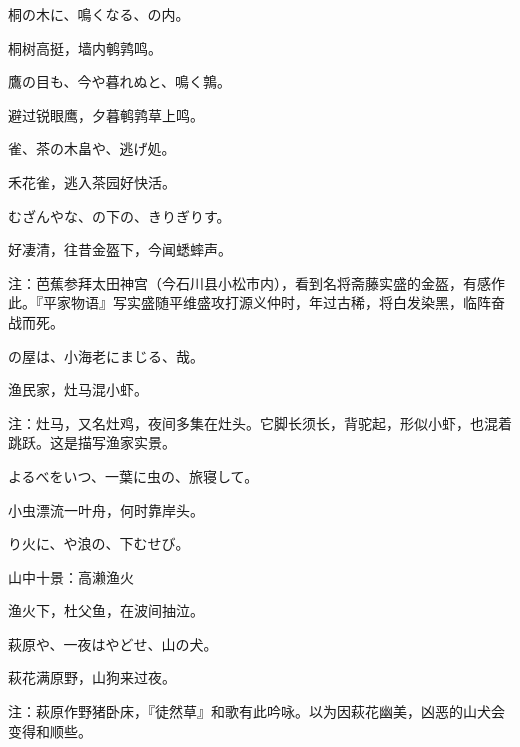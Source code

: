 \begin{haiku}
    {\FH 桐の木に、鳴くなる、の内。}

    {\FK 桐树高挺，墙内鹌鹑鸣。}
\end{haiku}

\begin{haiku}
    {\FH 鷹の目も、今や暮れぬと、鳴く鶉。}

    {\FK 避过锐眼鹰，夕暮鹌鹑草上鸣。}
\end{haiku}

\begin{haiku}
    {\FH {}雀、茶の木畠や、逃げ処。}

    {\FK 禾花雀，逃入茶园好快活。}
\end{haiku}

\begin{haiku}
    {\FH むざんやな、の下の、きりぎりす。}

    {\FK 好凄清，往昔金盔下，今闻蟋蟀声。}

    {\FT 注：芭蕉参拜太田神宫（今石川县小松市内），看到名将斋藤实盛的金盔，有感作此。『平家物语』写实盛随平维盛攻打源义仲时，年过古稀，将白发染黑，临阵奋战而死。}
\end{haiku}

\begin{haiku}
    {\FH {}の屋は、小海老にまじる、哉。}

    {\FK 渔民家，灶马混小虾。}

    {\FT 注：灶马，又名灶鸡，夜间多集在灶头。它脚长须长，背驼起，形似小虾，也混着跳跃。这是描写渔家实景。}
\end{haiku}

\begin{haiku}
    {\FH よるべをいつ、一葉に虫の、旅寝して。}

    {\FK 小虫漂流一叶舟，何时靠岸头。}
\end{haiku}

\begin{haiku}
    {\FH {}り火に、や浪の、下むせび。}

    {\FK 山中十景：高濑渔火}

    {\FK 渔火下，杜父鱼，在波间抽泣。}
\end{haiku}

\begin{haiku}
    {\FH 萩原や、一夜はやどせ、山の犬。}

    {\FK 萩花满原野，山狗来过夜。}

    {\FT 注：萩原作野猪卧床，『徒然草』和歌有此吟咏。以为因萩花幽美，凶恶的山犬会变得和顺些。}
\end{haiku}

